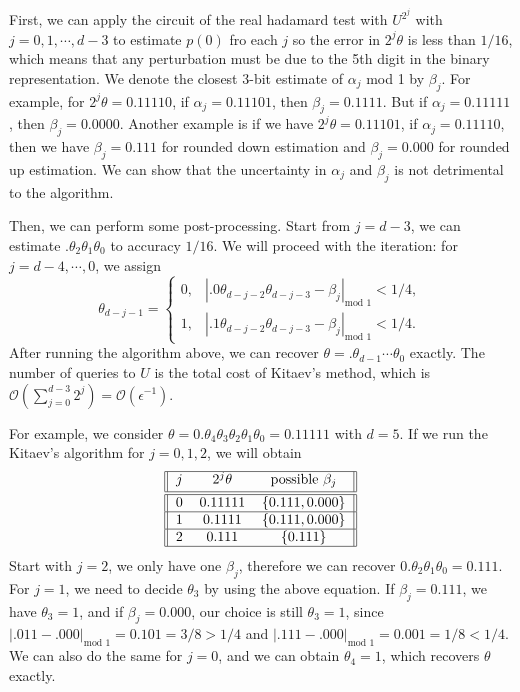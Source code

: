 \documentclass[11pt]{article}
\begin{document}
First, we can apply the circuit of the real hadamard test with $U^{2^j}$ with $j = 0,1,\cdots,d-3$ to estimate $p(0)$ fro each $j$ so the error in $2^j\theta$ is less than $1/16$, which means that any perturbation must be due to the 5th digit in the binary representation. We denote the closest 3-bit estimate of $\alpha_j$ mod 1 by $\beta_j$. For example, for $2^j\theta = 0.11110$, if $\alpha_j = 0.11101$, then $\beta_j = 0.1111$. But if $\alpha_j = 0.11111$, then $\beta_j = 0.0000$. Another example is if we have $2^j\theta = 0.11101$, if $\alpha_j = 0.11110$, then we have $\beta_j = 0.111$ for rounded down estimation and $\beta_j = 0.000$ for rounded up estimation. We can show that the uncertainty in $\alpha_j$ and $\beta_j$ is not detrimental to the algorithm.

Then, we can perform some post-processing. Start from $j = d-3$, we can estimate $.\theta_2\theta_1\theta_0$ to accuracy $1/16$. We will proceed with the iteration: for $j = d-4,\cdots,0$, we assign 
\begin{equation}
    \theta_{d-j-1} = \begin{cases}
        0, & |.0\theta_{d-j-2}\theta_{d-j-3} - \beta_j|_{\text{mod }1} < 1/4, \\
        1, & |.1\theta_{d-j-2}\theta_{d-j-3} - \beta_j|_{\text{mod }1} < 1/4.
    \end{cases}
\end{equation}
After running the algorithm above, we can recover $\theta = .\theta_{d-1}\cdots\theta_0$ exactly. The number of queries to $U$ is the total cost of Kitaev's method, which is $\mathcal{O}(\sum_{j=0}^{d-3}2^j) = \mathcal{O}(\epsilon^{-1})$.

For example, we consider $\theta = 0.\theta_4\theta_3\theta_2\theta_1\theta_0 = 0.11111$ with $d=5$. If we run the Kitaev's algorithm for $j = 0,1,2$, we will obtain 
\begin{equation*}
    \begin{tabular}{||c c c||} 
        \hline
        $j$ & $2^j\theta$ & $\text{possible }\beta_j$ \\ [0.5ex] 
        \hline\hline
        0 & 0.11111 & $\{0.111,0.000\}$  \\ 
        \hline
        1 & 0.1111 & $\{0.111,0.000\}$   \\
        \hline
        2 & 0.111 & $\{0.111\}$   \\
        \hline
        
       \end{tabular}
\end{equation*}
Start with $j = 2$, we only have one $\beta_j$, therefore we can recover $0.\theta_2\theta_1\theta_0 = 0.111$. For $j = 1$, we need to decide $\theta_3$ by using the above equation. If $\beta_j = 0.111$, we have $\theta_3 = 1$, and if $\beta_j = 0.000$, our choice is still $\theta_3 = 1$, since $|.011-.000|_{\text{mod }1} = 0.101 = 3/8 > 1/4$ and $|.111-.000|_{\text{mod }1} = 0.001 = 1/8 < 1/4$. We can also do the same for $j=0$, and we can obtain $\theta_4 = 1$, which recovers $\theta$ exactly.



\end{document}
